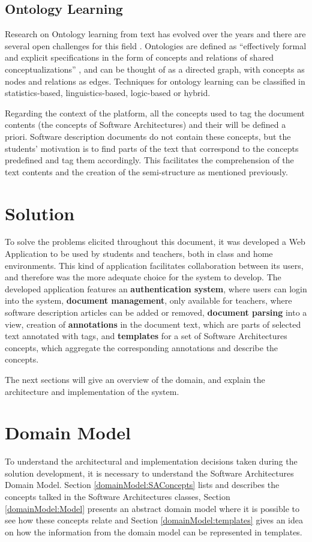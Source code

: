 \documentclass[conference]{IEEEtran}
\begin{document}
\subsection{Ontology Learning}
Research on Ontology learning from text has evolved over the years and there are several open challenges for this field \cite{wong2012ontology}. Ontologies are defined as ``effectively formal and explicit specifications in the form of concepts and relations of shared conceptualizations'' \cite{gruber1993translation}, and can be thought of as a directed graph, with concepts as nodes and relations as edges. Techniques for ontology learning can be classified in statistics-based, linguistics-based, logic-based or hybrid.

Regarding the context of the platform, all the concepts used to tag the document contents (the concepts of Software Architectures) and their will be defined a priori. Software description documents do not contain these concepts, but the students' motivation is to find parts of the text that correspond to the concepts predefined and tag them accordingly. This facilitates the comprehension of the text contents and the creation of the semi-structure as mentioned previously.

\section{Solution}
\label{solution}
To solve the problems elicited throughout this document, it was developed a Web Application to be used by students and teachers, both in class and home environments. This kind of application facilitates collaboration between its users, and therefore was the more adequate choice for the system to develop. The developed application features an \textbf{authentication system}, where users can login into the system, \textbf{document management}, only available for teachers, where software description articles can be added or removed, \textbf{document parsing } into a view, creation of \textbf{annotations} in the document text, which are parts of selected text annotated with tags, and \textbf{templates }for a set of Software Architectures concepts, which aggregate the corresponding annotations and describe the concepts.

The next sections will give an overview of the domain, and explain the architecture and implementation of the system.
\section{Domain Model}
\label{domainModel}
To understand the architectural and implementation decisions taken during the solution development, it is necessary to understand the Software Architectures Domain Model. Section \ref{domainModel:SAConcepts} lists and describes the concepts talked in the Software Architectures classes, Section \ref{domainModel:Model} presents an abstract domain model where it is possible to see how these concepts relate and Section \ref{domainModel:templates} gives an idea on how the information from the domain model can be represented in templates.
\end{document}
